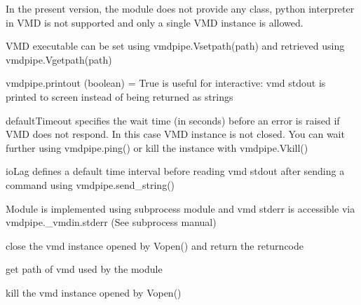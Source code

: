 \documentclass[letterpaper,10pt,english]{sphinxmanual}
\begin{document}
In the present version, the module does not provide any class,
python interpreter in VMD is not supported and only a single VMD
instance is allowed.

VMD executable can be set using vmdpipe.Vsetpath(path) and retrieved using vmdpipe.Vgetpath(path)

vmdpipe.printout (boolean) = True is useful for interactive: vmd stdout is
printed to screen instead of being returned as strings

defaultTimeout specifies the wait time (in seconds) before an error is raised 
if VMD does not respond. In this case VMD instance is not closed. 
You can wait further using vmdpipe.ping() or kill the instance with vmdpipe.Vkill()

ioLag defines a default time interval before reading vmd stdout after sending a command 
using vmdpipe.send\_string()

Module is implemented using subprocess module and vmd stderr is accessible via vmdpipe.\_vmdin.stderr 
(See subprocess manual)

\begin{fulllineitems}
\label{vmdpipe:vmdpipe.Vclose}
close the vmd instance opened by Vopen() and return the returncode

\end{fulllineitems}


\begin{fulllineitems}
\label{vmdpipe:vmdpipe.Vgetpath}
get path of vmd used by the module

\end{fulllineitems}


\begin{fulllineitems}
\label{vmdpipe:vmdpipe.Vkill}
kill the vmd instance opened by Vopen()

\end{fulllineitems}

\end{document}
